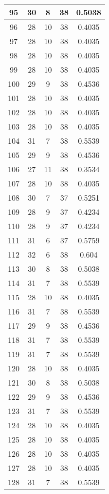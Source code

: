 \documentclass[letterpaper, 12pt]{article}
\begin{document}
\begin{longtable}{|c|c|c|c|c|}
\hline
95 & 30 & 8 & 38 & 0.5038 \\
\hline
96 & 28 & 10 & 38 & 0.4035 \\
\hline
97 & 28 & 10 & 38 & 0.4035 \\
\hline
98 & 28 & 10 & 38 & 0.4035 \\
\hline
99 & 28 & 10 & 38 & 0.4035 \\
\hline
100 & 29 & 9 & 38 & 0.4536 \\
\hline
101 & 28 & 10 & 38 & 0.4035 \\
\hline
102 & 28 & 10 & 38 & 0.4035 \\
\hline
103 & 28 & 10 & 38 & 0.4035 \\
\hline
104 & 31 & 7 & 38 & 0.5539 \\
\hline
105 & 29 & 9 & 38 & 0.4536 \\
\hline
106 & 27 & 11 & 38 & 0.3534 \\
\hline
107 & 28 & 10 & 38 & 0.4035 \\
\hline
108 & 30 & 7 & 37 & 0.5251 \\
\hline
109 & 28 & 9 & 37 & 0.4234 \\
\hline
110 & 28 & 9 & 37 & 0.4234 \\
\hline
111 & 31 & 6 & 37 & 0.5759 \\
\hline
112 & 32 & 6 & 38 & 0.604 \\
\hline
113 & 30 & 8 & 38 & 0.5038 \\
\hline
114 & 31 & 7 & 38 & 0.5539 \\
\hline
115 & 28 & 10 & 38 & 0.4035 \\
\hline
116 & 31 & 7 & 38 & 0.5539 \\
\hline
117 & 29 & 9 & 38 & 0.4536 \\
\hline
118 & 31 & 7 & 38 & 0.5539 \\
\hline
119 & 31 & 7 & 38 & 0.5539 \\
\hline
120 & 28 & 10 & 38 & 0.4035 \\
\hline
121 & 30 & 8 & 38 & 0.5038 \\
\hline
122 & 29 & 9 & 38 & 0.4536 \\
\hline
123 & 31 & 7 & 38 & 0.5539 \\
\hline
124 & 28 & 10 & 38 & 0.4035 \\
\hline
125 & 28 & 10 & 38 & 0.4035 \\
\hline
126 & 28 & 10 & 38 & 0.4035 \\
\hline
127 & 28 & 10 & 38 & 0.4035 \\
\hline
128 & 31 & 7 & 38 & 0.5539 \\

\end{longtable}
\end{document}
